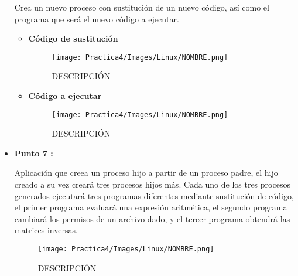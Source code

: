 \documentclass[12pt]{article}
\begin{document}
\begin{itemize}
                    Crea un nuevo proceso con sustitución de un nuevo código, así como el programa que será el nuevo código a ejecutar.
                    \begin{itemize}
                        \item \textbf{Código de sustitución}
                            \begin{figure}[h!]
                                \centering
                                \texttt{[image: Practica4/Images/Linux/NOMBRE.png]}
                                \caption{DESCRIPCIÓN}
                            \end{figure}

                        
                        \item \textbf{Código a ejecutar}
                            \begin{figure}[h!]
                                \centering
                                \texttt{[image: Practica4/Images/Linux/NOMBRE.png]}
                                \caption{DESCRIPCIÓN}
                            \end{figure}

                          
                    \end{itemize}
                
                \item[\Checkmark] \textbf{Punto 7 :}

                    Aplicación que creea un proceso hijo a partir de un proceso padre, el hijo creado a su vez creará tres procesos hijos más. Cada uno de los tres procesos generados ejecutará tres programas diferentes mediante sustitución de código, el primer programa evaluará una expresión aritmética, el segundo programa cambiará los permisos de un archivo dado, y el tercer programa obtendrá las matrices inversas.

                    \begin{figure}[h!]
                        \centering
                        \texttt{[image: Practica4/Images/Linux/NOMBRE.png]}
                        \caption{DESCRIPCIÓN}
                    \end{figure}


\end{itemize}
\end{document}
